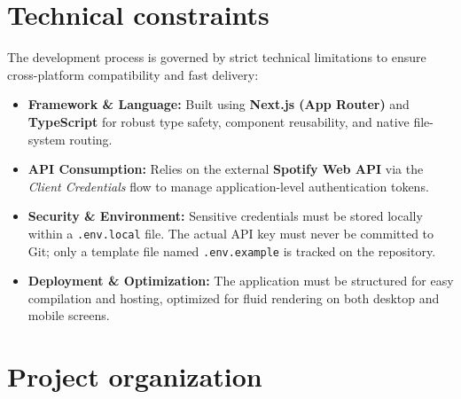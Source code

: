 \documentclass{article}
\begin{document}
\section{Technical constraints}
The development process is governed by strict technical limitations to ensure cross-platform compatibility and fast delivery:

\begin{itemize}
    \item \textbf{Framework \& Language:} Built using \textbf{Next.js (App Router)} and \textbf{TypeScript} for robust type safety, component reusability, and native file-system routing.
    \item \textbf{API Consumption:} Relies on the external \textbf{Spotify Web API} via the \textit{Client Credentials} flow to manage application-level authentication tokens.
    \item \textbf{Security \& Environment:} Sensitive credentials must be stored locally within a \texttt{.env.local} file. The actual API key must never be committed to Git; only a template file named \texttt{.env.example} is tracked on the repository.
    \item \textbf{Deployment \& Optimization:} The application must be structured for easy compilation and hosting, optimized for fluid rendering on both desktop and mobile screens.
\end{itemize} 





\newpage
\section{Project organization}
\end{document}

